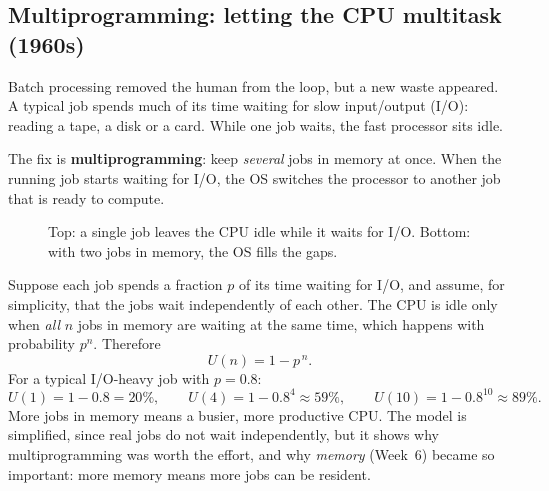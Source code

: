 \documentclass[11pt,a4paper]{article}
\newcommand{\term}[1]{\textbf{\color{mintdeep}#1}}
\begin{document}
\subsection{Multiprogramming: letting the CPU multitask (1960s)}
\label{sec:multiprog}

Batch processing removed the human from the loop, but a new waste appeared. A typical job spends much of its time waiting for slow input/output (I/O): reading a tape, a disk or a card. While one job waits, the fast processor sits idle.

The fix is \term{multiprogramming}: keep \emph{several} jobs in memory at once. When the running job starts waiting for I/O, the OS switches the processor to another job that is ready to compute.

\begin{figure}[H]
\centering
{}
\caption{Top: a single job leaves the CPU idle while it waits for I/O. Bottom: with two jobs in memory, the OS fills the gaps.}
\end{figure}

\begin{example}
Suppose each job spends a fraction $p$ of its time waiting for I/O, and assume, for simplicity, that the jobs wait independently of each other. The CPU is idle only when \emph{all} $n$ jobs in memory are waiting at the same time, which happens with probability $p^{n}$. Therefore
\[
U(n) = 1 - p^{\,n}.
\]
For a typical I/O-heavy job with $p = 0.8$:
\[
U(1) = 1 - 0.8 = 20\%, \qquad U(4) = 1 - 0.8^{4} \approx 59\%, \qquad U(10) = 1 - 0.8^{10} \approx 89\%.
\]
More jobs in memory means a busier, more productive CPU. The model is simplified, since real jobs do not wait independently, but it shows why multiprogramming was worth the effort, and why \emph{memory} (Week~6) became so important: more memory means more jobs can be resident.
\end{example}
\end{document}
